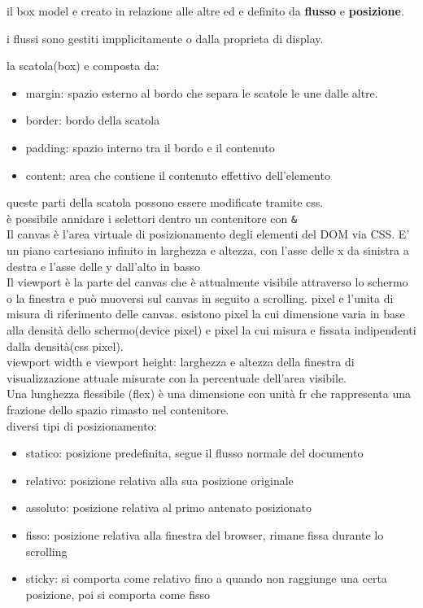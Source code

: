 \documentclass[12pt]{article}
\begin{document}
il box model e creato in relazione alle altre ed e definito da \textbf{flusso} e \textbf{posizione}.

i flussi sono gestiti impplicitamente o dalla proprieta di display.

la scatola(box) e composta da:
\begin{itemize}
    \item margin: spazio esterno al bordo che separa le scatole le une dalle altre.
    \item border: bordo della scatola
    \item padding: spazio interno tra il bordo e il contenuto
    \item content: area che contiene il contenuto effettivo dell'elemento
    \end{itemize}

    queste parti della scatola possono essere modificate tramite css. \\

    è possibile annidare i selettori dentro un contenitore con \texttt{\&} \\

    Il canvas è l'area virtuale di posizionamento degli elementi del DOM via
CSS. E' un piano cartesiano infinito in larghezza e altezza, con l'asse delle x
da sinistra a destra e l'asse delle y dall'alto in basso \\
Il viewport è la parte del canvas che è attualmente visibile attraverso lo
schermo o la finestra e può muoversi sul canvas in seguito a scrolling.
pixel e l'unita di misura di riferimento delle canvas.
esistono pixel la cui dimensione varia in base alla densità dello schermo(device pixel) e pixel la cui misura e fissata indipendenti dalla densità(css pixel).\\

viewport width e viewport height: larghezza e altezza della finestra di visualizzazione attuale misurate con la percentuale dell'area visibile.\\

Una lunghezza flessibile (flex) è una dimensione con unità
fr che rappresenta una frazione dello spazio rimasto nel
contenitore.\\

diversi tipi di posizionamento:
\begin{itemize}
    \item statico: posizione predefinita, segue il flusso normale del documento
    \item relativo: posizione relativa alla sua posizione originale
    \item assoluto: posizione relativa al primo antenato posizionato
    \item fisso: posizione relativa alla finestra del browser, rimane fissa durante lo scrolling
    \item sticky: si comporta come relativo fino a quando non raggiunge una certa posizione, poi si comporta come fisso
    \end{itemize}
\end{document}
